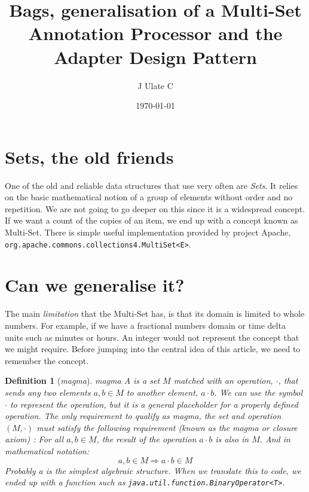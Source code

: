 \documentclass{article}
\title{Bags, generalisation of a Multi-Set \\
{\small Annotation Processor and the Adapter Design Pattern}}
\author{J Ulate C}
\date{\today}
\newtheorem{definition}{Definition}
\begin{document}
\maketitle

\section{Sets, the old friends}

One of the old and reliable data structures that use very often are \textit{Sets}. It relies on the basic mathematical notion of a group of elements without order and no repetition. We are not going to go deeper on this since it is a widespread concept. If we want a count of the copies of an item, we end up with a concept known as Multi-Set. There is simple useful implementation provided by project Apache, \texttt{org.apache.commons.collections4.MultiSet<E>}.

\section{Can we generalise it?}

The main \textit{limitation} that the Multi-Set has, is that its domain is limited to whole numbers. For example, if we have a fractional numbers domain or time delta units such as minutes or hours. An integer would not represent the concept that we might require. Before jumping into the central idea of this article, we need to remember the  concept.

\begin{definition}[\textit{magma}]{magma}
\label{def:magma}
A  is a set $M$ matched with an operation, $\cdot$, that sends any two elements $a, b \in M$ to another element, $a \cdot b$. We can use the symbol $\cdot$ to represent the operation, but it is a general placeholder for a properly defined operation. The only requirement to qualify as magma, the set and operation $(M, \cdot)$ must satisfy the following requirement (known as the magma or closure axiom) \cite{Suschkewitsch1929OnLaw, Hausmann1937TheoryQuasi-Groups}:
For all $a, b \in M$, the result of the operation $a \cdot b$ is also in $M$.
And in mathematical notation:
\begin{equation}
a,b \in M \Rightarrow a \cdot b \in M
\end{equation}
Probably a  is the simplest algebraic structure. When we translate this to code, we ended up with a function such as \texttt{java.util.function.BinaryOperator<T>}.
\end{definition}
\end{document}
